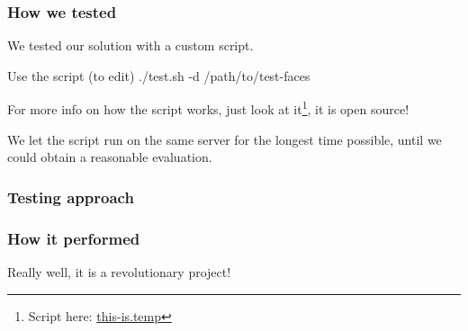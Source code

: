 \begin{frame} \frametitle{How we tested}

	We tested our solution with a custom script.
	
	\vfill

	\begin{block}{Use the script (to edit)}
		./test.sh -d /path/to/test-faces
	\end{block}
	
	For more info on how the script works, just look at 
	it\footnote{Script here: 
	{\color{red} \url{this-is.temp}}}, it is open source!

	\vfill
	
	We let the script run on the same server for the longest
	time possible, until we could obtain a reasonable evaluation.

\end{frame}

\begin{frame} \frametitle{Testing approach}

\end{frame}

\begin{frame} \frametitle{How it performed}

	Really well, it is a revolutionary project!

\end{frame}
